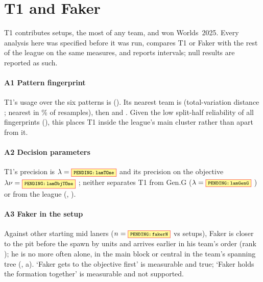 \section{T1 and Faker}
\label{app:t1}

T1 contributes  setups, the most of any team, and won Worlds~2025.
Every analysis here was specified before it was run, compares T1 or Faker with the rest of the league on the same measures, and reports intervals; null results are reported as such.

\paragraph*{A1 Pattern fingerprint}
T1's usage over the six patterns is  ().
Its nearest team is  (total-variation distance ; nearest in \% of resamples), then  and .
Given the low split-half reliability of all fingerprints (), this places T1 inside the league's main cluster rather than apart from it.

\paragraph*{A2 Decision parameters}
T1's precision is $\lambda=\V{lamTOne}$  and its precision on the objective $\lambda\nu=\V{lamObjTOne}$ ; neither separates T1 from Gen.G ($\lambda=\V{lamGenG}$ ) or from the league (, ).


\paragraph*{A3 Faker in the setup}
Against other starting mid laners ($n=\V{fakerN}$ vs  setups), Faker is closer to the pit before the spawn by   units and arrives earlier in his team's order (rank  ); he is no more often alone, in the main block or central in the team's spanning tree (, a).
`Faker gets to the objective first' is measurable and true; `Faker holds the formation together' is measurable and not supported.

